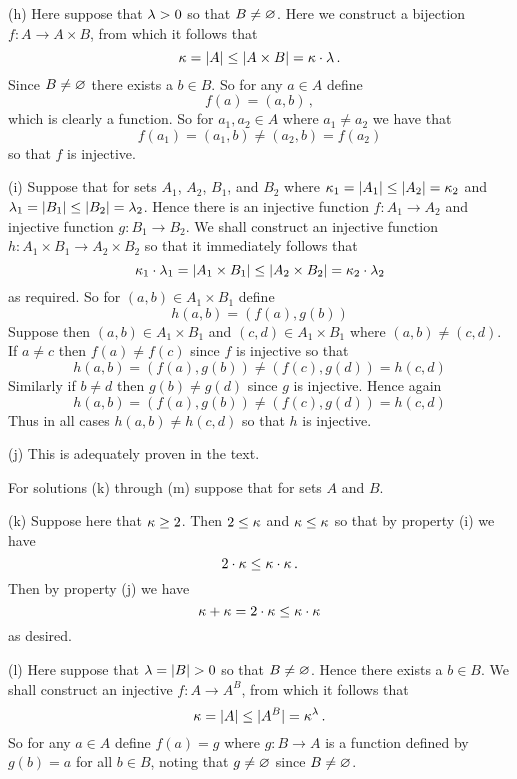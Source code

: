 \begin{solution}
    (h) Here suppose that $\lambda > 0$  so that $B \neq \varnothing$.
    Here we construct a bijection $f: A \to A \times B$, from which it follows that
    $$
    \kappa = |A| \leq |A \times B| = \kappa \cdot \lambda \,.
    $$
    Since $B \neq \varnothing$ there exists a $b \in B$.
    So for any $a \in A$ define
    $$
    f(a) = (a, b) \,,
    $$
    which is clearly a function.
    So for $a_1, a_2 \in A$ where $a_1 \neq a_2$ we have that
    $$
    f(a_1) = (a_1, b) \neq (a_2, b) = f(a_2)
    $$
    so that $f$ is injective. \qedsymbol

    (i) Suppose that
    for sets $A_1$, $A_2$, $B_1$, and $B_2$ where $\kappa_1 = |A_1| \leq |A_2| = \kappa_2$ and $\lambda_1 = |B_1| \leq |B_2| = \lambda_2$.
    Hence there is an injective function $f: A_1 \to A_2$ and injective function $g: B_1 \to B_2$.
    We shall construct an injective function $h: A_1 \times B_1 \to A_2 \times B_2$ so that it immediately follows that
    $$
    \kappa_1 \cdot \lambda_1 = |A_1 \times B_1| \leq |A_2 \times B_2| = \kappa_2 \cdot \lambda_2
    $$
    as required.
    So for $(a, b) \in A_1 \times B_1$ define
    $$
    h(a, b) = (f(a), g(b))
    $$
    Suppose then $(a, b) \in A_1 \times B_1$ and $(c, d) \in A_1 \times B_1$ where $(a,b) \neq (c,d)$.
    If $a \neq c$ then $f(a) \neq f(c)$ since $f$ is injective so that
    $$
    h(a,b) = (f(a), g(b)) \neq (f(c), g(d)) = h(c,d)
    $$
    Similarly if $b \neq d$ then $g(b) \neq g(d)$ since $g$ is injective.
    Hence again
    $$
    h(a,b) = (f(a), g(b)) \neq (f(c), g(d)) = h(c,d)
    $$
    Thus in all cases $h(a,b) \neq h(c,d)$ so that $h$ is injective. \qedsymbol

    (j) This is adequately proven in the text.

    For solutions (k) through (m) suppose that
    for sets $A$ and $B$.
    
    (k) Suppose here that $\kappa \geq 2$.
    Then $2 \leq \kappa$ and $\kappa \leq \kappa$ so that by property (i) we have
    $$
    2 \cdot \kappa \leq \kappa \cdot \kappa \,.
    $$
    Then by property (j) we have
    $$
    \kappa + \kappa = 2 \cdot \kappa \leq \kappa \cdot \kappa
    $$
    as desired. \qedsymbol

    (l) Here suppose that $\lambda = |B| > 0$ so that $B \neq \varnothing$.
    Hence there exists a $b \in B$.
    We shall construct an injective $f: A \to A^B$, from which it follows that
    $$
    \kappa = |A| \leq |A^B| = \kappa^\lambda \,.
    $$
    So for any $a \in A$ define $f(a) = g$ where $g : B \to A$ is a function defined by $g(b) = a$ for all $b \in B$, noting that $g \neq \varnothing$ since $B \neq \varnothing$.


\end{solution}
